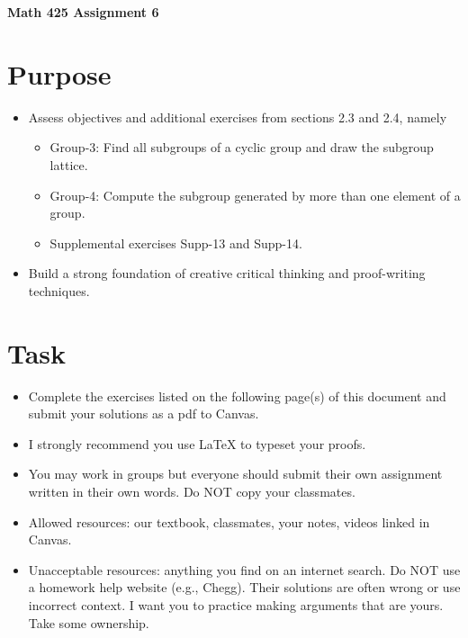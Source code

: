\documentclass[12pt]{article}
\begin{document}
	\begin{center}
		{\Large \bf Math 425 Assignment 6}
	\end{center}
	\section*{Purpose}
	\begin{itemize}
		\item Assess objectives and additional exercises from sections 2.3 and 2.4, namely
		\begin{itemize}
			\item Group-3: Find all subgroups of a cyclic group and draw the subgroup lattice.
			\item Group-4: Compute the subgroup generated by more than one element of a group.
			\item Supplemental exercises Supp-13 and Supp-14.
		\end{itemize}
		\item Build a strong foundation of creative critical thinking and proof-writing techniques.
	\end{itemize}
	\section*{Task}
	\begin{itemize}
		\item Complete the exercises listed on the following page(s) of this document and submit your solutions as a pdf to Canvas.
		\item I strongly recommend you use LaTeX to typeset your proofs.
		\item You may work in groups but everyone should submit their own assignment written in their own words.  Do NOT copy your classmates.
		\item Allowed resources: our textbook, classmates, your notes, videos linked in Canvas.
		\item Unacceptable resources: anything you find on an internet search. Do NOT use a homework help website (e.g., Chegg). Their solutions are often wrong or use incorrect context.  I want you to practice making arguments that are yours. Take some ownership.
	\end{itemize}
\end{document}
